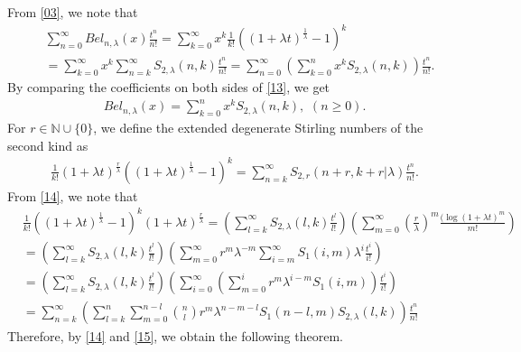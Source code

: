 \documentclass[10pt,twoside,reqno]{amsart}
\numberwithin{equation}{section}
\begin{document}
From \eqref{03}, we note that
\begin{equation}\begin{split}\label{13}
&\sum_{n=0}^\infty Bel_{n,\lambda }(x) \frac{t^n}{n!} = \sum_{k=0}^\infty x^k \frac{1}{k!} ((1+\lambda t)^{\frac{1}{\lambda }}-1)^k\\
&= \sum_{k=0}^\infty x^k \sum_{n=k}^\infty S_{2,\lambda }(n,k) \frac{t^n}{n!} = \sum_{n=0}^\infty \left( \sum_{k=0}^n x^k S_{2,\lambda }(n,k) \right) \frac{t^n}{n!}.
\end{split}\end{equation}
By comparing the coefficients on both sides of \eqref{13}, we get
\begin{equation*}\begin{split}
Bel_{n,\lambda }(x) = \sum_{k=0}^n x^k S_{2,\lambda }(n,k), \,\,(n \geq 0).
\end{split}\end{equation*}
For $r \in \mathbb{N} \cup \{0\}$, we define the extended degenerate Stirling numbers of the second kind as
\begin{equation}\begin{split}\label{14}
\frac{1}{k!} (1+\lambda t)^{\frac{r}{\lambda }} ((1+\lambda t)^{\frac{1}{\lambda }}-1)^k = \sum_{n=k}^\infty S_{2,r}(n+r,k+r|\lambda ) \frac{t^n}{n!}.
\end{split}\end{equation}
From \eqref{14}, we note that
\begin{equation}\begin{split}\label{15}
&\frac{1}{k!}((1+\lambda t)^{\frac{1}{\lambda }}-1)^k (1+\lambda t)^{\frac{r}{\lambda }}= \left( \sum_{l=k}^\infty S_{2,\lambda }(l,k) \frac{t^l}{l!} \right) \left( \sum_{m=0}^\infty \left(\frac{r}{\lambda }\right)^m \frac{(\log(1+\lambda t)^m}{m!} \right)\\
&= \left( \sum_{l=k}^\infty S_{2,\lambda }(l,k) \frac{t^l}{l!} \right) \left( \sum_{m=0}^\infty r^m \lambda ^{-m} \sum_{i=m}^\infty S_1 (i,m) \lambda ^i \frac{t^i}{i!} \right)\\
&= \left( \sum_{l=k}^\infty S_{2,\lambda }(l,k) \frac{t^l}{l!} \right) \left( \sum_{i=0}^\infty \left( \sum_{m=0}^i r^m \lambda ^{i-m} S_1(i,m) \right) \frac{t^i}{i!} \right)\\
&= \sum_{n=k}^\infty \left( \sum_{l=k}^n \sum_{m=0}^{n-l} {n \choose l} r^m \lambda ^{n-m-l} S_1(n-l,m) S_{2,\lambda }(l,k) \right) \frac{t^n}{n!}
\end{split}\end{equation}
Therefore, by \eqref{14} and \eqref{15}, we obtain the following theorem.
\end{document}
